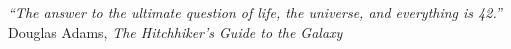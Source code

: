 \thispagestyle{plain}

{
\raggedleft
\textit{``The answer to the ultimate question of life, the universe, and everything is 42.''}
\\ Douglas Adams, \textit{The Hitchhiker's Guide to the Galaxy}

}
